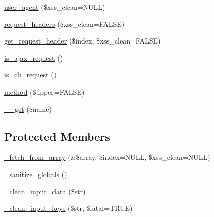\begin{DoxyCompactItemize}
\item 
\mbox{\hyperlink{class_c_i___input_a4374172b6440fd600f78ff8efc0906c9}{user\+\_\+agent}} (\$xss\+\_\+clean=N\+U\+LL)
\item 
\mbox{\hyperlink{class_c_i___input_a4bc8f8c9a9488ff359a61f1fb60e6097}{request\+\_\+headers}} (\$xss\+\_\+clean=F\+A\+L\+SE)
\item 
\mbox{\hyperlink{class_c_i___input_a099af71b54f9edbfb20576a4e8a3df41}{get\+\_\+request\+\_\+header}} (\$index, \$xss\+\_\+clean=F\+A\+L\+SE)
\item 
\mbox{\hyperlink{class_c_i___input_a4ae07120b0b2ace90eb2f7ec72b29426}{is\+\_\+ajax\+\_\+request}} ()
\item 
\mbox{\hyperlink{class_c_i___input_a70c1e8a081ef955c1a52164634d4f66e}{is\+\_\+cli\+\_\+request}} ()
\item 
\mbox{\hyperlink{class_c_i___input_aaa22626885bdf9dda2346ee6422203ef}{method}} (\$upper=F\+A\+L\+SE)
\item 
\mbox{\hyperlink{class_c_i___input_abc8e9e31bb15c8a44c3210ec551407c8}{\+\_\+\+\_\+get}} (\$name)
\end{DoxyCompactItemize}
\subsection*{Protected Members}
\begin{DoxyCompactItemize}
\item 
\mbox{\hyperlink{class_c_i___input_aac46f9fee9467fac5711f236d248fbc7}{\+\_\+fetch\+\_\+from\+\_\+array}} (\&\$array, \$index=N\+U\+LL, \$xss\+\_\+clean=N\+U\+LL)
\item 
\mbox{\hyperlink{class_c_i___input_aadbb0e5cbf9b5783c872cb402ea6a2fa}{\+\_\+sanitize\+\_\+globals}} ()
\item 
\mbox{\hyperlink{class_c_i___input_a9c594152e7b189a290f6425df8712b73}{\+\_\+clean\+\_\+input\+\_\+data}} (\$str)
\item 
\mbox{\hyperlink{class_c_i___input_ac1c5fa9a21372d3dacb1fb99f9418384}{\+\_\+clean\+\_\+input\+\_\+keys}} (\$str, \$fatal=T\+R\+UE)
\end{DoxyCompactItemize}
